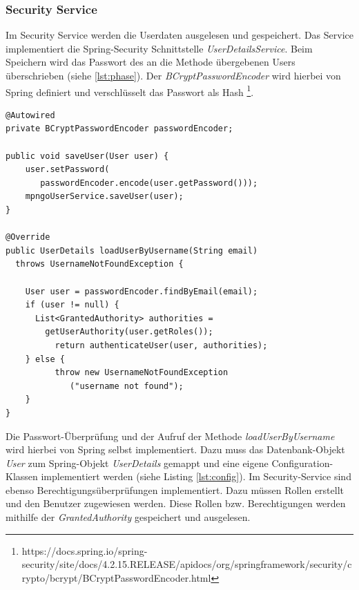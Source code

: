 \subsubsection{Security Service}   
Im Security Service werden die Userdaten ausgelesen und gespeichert. Das Service implementiert die Spring-Security Schnittstelle \textit{UserDetailsService}. Beim Speichern wird das Passwort des an die Methode übergebenen Users überschrieben (siehe \ref{lst:phase}). Der \textit{BCryptPasswordEncoder} wird hierbei von Spring definiert und verschlüsselt das Passwort als Hash \footnote{https://docs.spring.io/spring-security/site/docs/4.2.15.RELEASE/apidocs/org/springframework/security/crypto/bcrypt/BCryptPasswordEncoder.html}. 

\lstset{
  caption={Speichern und Auslesen des Users. Beim Speichern des Benutzers wird das Passwort automatisch verschlüsselt.}, 
  basicstyle=\small\ttfamily, 
  label=lst:phase, 
  language=Java,
  frame=single,
  breaklines=true, %
  postbreak=\mbox{\textcolor{red}{$\hookrightarrow$}\space},
}

\begin{samepage}%
	\begin{lstlisting}[float=tbhp]
@Autowired
private BCryptPasswordEncoder passwordEncoder;

public void saveUser(User user) {
    user.setPassword(
       passwordEncoder.encode(user.getPassword()));
    mpngoUserService.saveUser(user);
}

@Override
public UserDetails loadUserByUsername(String email) 
  throws UsernameNotFoundException {

    User user = passwordEncoder.findByEmail(email);
    if (user != null) {
      List<GrantedAuthority> authorities =     
        getUserAuthority(user.getRoles());
          return authenticateUser(user, authorities);
    } else {
          throw new UsernameNotFoundException
             ("username not found");
    }
}
	\end{lstlisting}
\end{samepage}
Die Passwort-Überprüfung und der Aufruf der Methode \textit{loadUserByUsername} wird hierbei von Spring selbst implementiert.  Dazu muss das Datenbank-Objekt \textit{User} zum Spring-Objekt \textit{UserDetails} gemappt und eine eigene Configuration-Klassen implementiert werden (siehe Listing \ref{lst:config}). Im Security-Service sind ebenso Berechtigungsüberprüfungen implementiert. Dazu müssen Rollen erstellt und den Benutzer zugewiesen werden. Diese Rollen bzw. Berechtigungen werden mithilfe der \textit{GrantedAuthority} gespeichert und ausgelesen.

